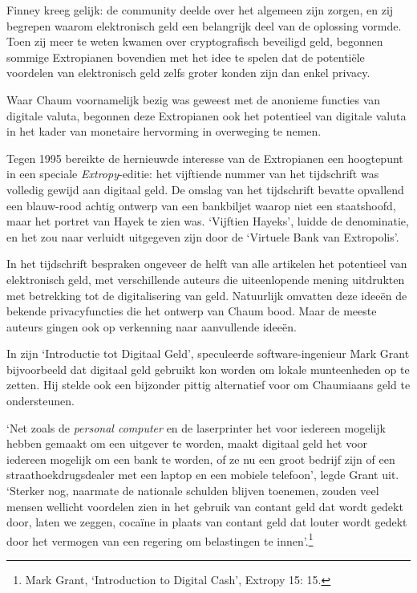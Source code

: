 \documentclass[
  a5paper,
  smalldemyvopaper,11pt,twoside,onecolumn,openright,extrafontsizes]{memoir}
\begin{document}
Finney kreeg gelijk: de community deelde over het algemeen zijn zorgen,
en zij begrepen waarom elektronisch geld een belangrijk deel van de
oplossing vormde. Toen zij meer te weten kwamen over cryptografisch
beveiligd geld, begonnen sommige Extropianen bovendien met het idee te
spelen dat de potentiële voordelen van elektronisch geld zelfs groter
konden zijn dan enkel privacy.

Waar Chaum voornamelijk bezig was geweest met de anonieme functies van
digitale valuta, begonnen deze Extropianen ook het potentieel van
digitale valuta in het kader van monetaire hervorming in overweging te
nemen.

Tegen 1995 bereikte de hernieuwde interesse van de Extropianen een
hoogtepunt in een speciale \emph{Extropy}-editie: het vijftiende nummer
van het tijdschrift was volledig gewijd aan digitaal geld. De omslag van
het tijdschrift bevatte opvallend een blauw-rood achtig ontwerp van een
bankbiljet waarop niet een staatshoofd, maar het portret van Hayek te
zien was. `Vijftien Hayeks', luidde de denominatie, en het zou naar
verluidt uitgegeven zijn door de `Virtuele Bank van Extropolis'.

In het tijdschrift bespraken ongeveer de helft van alle artikelen het
potentieel van elektronisch geld, met verschillende auteurs die
uiteenlopende mening uitdrukten met betrekking tot de digitalisering van
geld. Natuurlijk omvatten deze ideeën de bekende privacyfuncties die het
ontwerp van Chaum bood. Maar de meeste auteurs gingen ook op verkenning
naar aanvullende ideeën.

In zijn `Introductie tot Digitaal Geld', speculeerde software-ingenieur
Mark Grant bijvoorbeeld dat digitaal geld gebruikt kon worden om lokale
munteenheden op te zetten. Hij stelde ook een bijzonder pittig
alternatief voor om Chaumiaans geld te ondersteunen.

`Net zoals de \emph{personal computer} en de laserprinter het voor
iedereen mogelijk hebben gemaakt om een uitgever te worden, maakt
digitaal geld het voor iedereen mogelijk om een bank te worden, of ze nu
een groot bedrijf zijn of een straathoekdrugsdealer met een laptop en
een mobiele telefoon', legde Grant uit. `Sterker nog, naarmate de
nationale schulden blijven toenemen, zouden veel mensen wellicht
voordelen zien in het gebruik van contant geld dat wordt gedekt door,
laten we zeggen, cocaïne in plaats van contant geld dat louter wordt
gedekt door het vermogen van een regering om belastingen te
innen'.\footnote{Mark Grant, `Introduction to Digital Cash', Extropy 15:
  15.}
\end{document}
